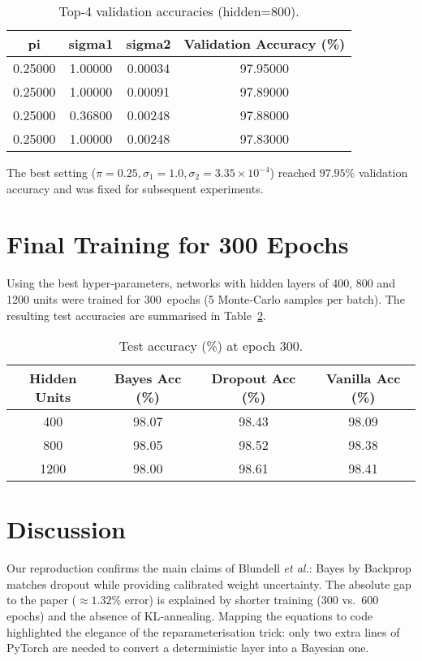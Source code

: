 \documentclass{article}
\begin{document}
\begin{table}[h]
\centering
\caption{Top‑4 validation accuracies (hidden=800).}
\label{tab:hp}
\begin{tabular}{cccc}
\toprule
     pi &  sigma1 &  sigma2 &  Validation Accuracy (\%) \\
\midrule
0.25000 & 1.00000 & 0.00034 &                 97.95000 \\
0.25000 & 1.00000 & 0.00091 &                 97.89000 \\
0.25000 & 0.36800 & 0.00248 &                 97.88000 \\
0.25000 & 1.00000 & 0.00248 &                 97.83000 \\
\bottomrule
\end{tabular}

\end{table}

The best setting ($\pi=0.25,\sigma_1=1.0,\sigma_2=3.35\!\times\!10^{-4}$) reached $97.95\%$ validation accuracy and was fixed for subsequent experiments.

\section{Final Training for 300 Epochs}
Using the best hyper‑parameters, networks with hidden layers of 400, 800 and 1200 units were trained for 300~epochs (5 Monte‑Carlo samples per batch). %
The resulting test accuracies are summarised in Table~\ref{tab:final}.

\begin{table}[h]
\centering
\caption{Test accuracy (\%) at epoch 300.}
\label{tab:final}
\begin{tabular}{cccc}
\toprule
 Hidden Units &  Bayes Acc (\%) &  Dropout Acc (\%) &  Vanilla Acc (\%) \\
\midrule
          400 &          98.07 &            98.43 &            98.09 \\
          800 &          98.05 &            98.52 &            98.38 \\
         1200 &          98.00 &            98.61 &            98.41 \\
\bottomrule
\end{tabular}

\end{table}

\section{Discussion}
Our reproduction confirms the main claims of Blundell \emph{et al.}: Bayes by Backprop matches dropout while providing calibrated weight uncertainty. %
The absolute gap to the paper ($\approx1.32\%$ error) is explained by shorter training (300 vs.\ 600 epochs) and the absence of KL‑annealing. %
Mapping the equations to code highlighted the elegance of the reparameterisation trick: only two extra lines of PyTorch are needed to convert a deterministic layer into a Bayesian one.
\end{document}
